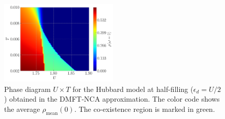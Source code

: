 \documentclass[12pt]{report}
\begin{document}
\begin{figure}[H]
\centering
\includegraphics[width=0.5\textwidth]{fig/dmft/triangle-w0-mu050.png}
\caption{Phase diagram  $U \times T$ for the Hubbard model at half-filling ($\epsilon_d=U/2$) obtained in the DMFT-NCA approximation. The color code shows the average $\rho_{\text{mean}}(0)$. The co-existence region is marked in green.}
\label{fig:triangle-mu050}
\end{figure}
\end{document}

